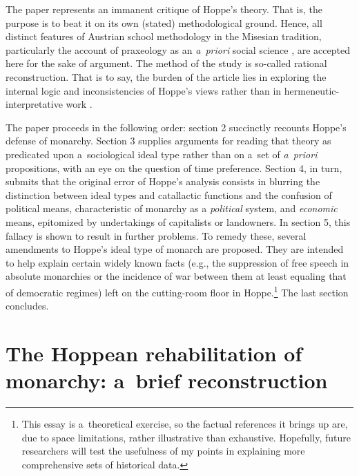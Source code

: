 The paper represents an immanent critique of Hoppe's theory. That is, the purpose is to beat it on its own (stated) methodological ground. Hence, all distinct features of Austrian school methodology in the Misesian tradition, particularly the account of praxeology as an \textit{a~priori} social science 
\parencites[see][]{mises_ultimate_1962}[][]{mises_human_1998}[][]{mises_theory_2007}, %
 are accepted here for the sake of argument. The method of the study is so-called rational reconstruction. That is to say, the burden of the article lies in exploring the internal logic and inconsistencies of Hoppe's views rather than in hermeneutic-interpretative work 
\parencite[][]{linsbichler_was_2017}.%




The paper proceeds in the following order: section 2 succinctly recounts Hoppe's defense of monarchy. Section 3 supplies arguments for reading that theory as predicated upon a~sociological ideal type rather than on a~set of \textit{a~priori} propositions, with an eye on the question of time preference. Section 4, in turn, submits that the original error of Hoppe's analysis consists in blurring the distinction between ideal types and catallactic functions and the confusion of political means, characteristic of monarchy as a \textit{political} system, and \textit{economic} means, epitomized by undertakings of capitalists or landowners. In section 5, this fallacy is shown to result in further problems. To remedy these, several amendments to Hoppe's ideal type of monarch are proposed. They are intended to help explain certain widely known facts (e.g., the suppression of free speech in absolute monarchies or the incidence of war between them at least equaling that of democratic regimes) left on the cutting-room floor in Hoppe.\footnote{This essay is a~theoretical exercise, so the factual references it brings up are, due to space limitations, rather illustrative than exhaustive. Hopefully, future researchers will test the usefulness of my points in explaining more comprehensive sets of historical data. } The last section concludes.



\section{The Hoppean rehabilitation of monarchy: a~brief reconstruction}

